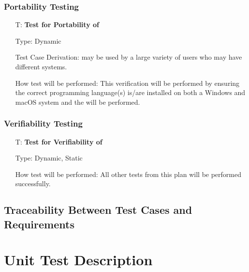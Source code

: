 \documentclass[12pt, titlepage]{article}
\newcounter{testnum} %
\begin{document}
\subsubsection{Portability Testing}

\begin{enumerate}

  \item[T\refstepcounter{testnum}\thetestnum \label{test_portable}:]
    \textbf{Test for Portability of \progname{}}

    Type: Dynamic

    Test Case Derivation: \progname{} may be used by a large variety of users
    who may have different systems.

    How test will be performed: This verification will be performed by
    ensuring the correct programming language(s) is/are installed on both a
    Windows and macOS system and the  will be
    performed. %

\end{enumerate}

\subsubsection{Verifiability Testing}

\begin{enumerate}

  \item[T\refstepcounter{testnum}\thetestnum \label{test_verifiable}:]
    \textbf{Test for Verifiability of \progname{}}

    Type: Dynamic, Static

    How test will be performed: All other tests from this plan will be
    performed successfully.

\end{enumerate}

\subsection{Traceability Between Test Cases and Requirements}


\section{Unit Test Description} \label{sec_unit_tests}
\end{document}

